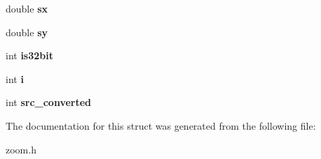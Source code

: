 \begin{DoxyCompactItemize}
\item 
double {\bfseries sx}\hypertarget{structzoom_a280d6095f6a032474b4b10ca0a9fa08a}{}\label{structzoom_a280d6095f6a032474b4b10ca0a9fa08a}

\item 
double {\bfseries sy}\hypertarget{structzoom_af138143150698333ed5d372af4d85704}{}\label{structzoom_af138143150698333ed5d372af4d85704}

\item 
int {\bfseries is32bit}\hypertarget{structzoom_aaa8e07a34f86b9cdbbea024dca4e6f5e}{}\label{structzoom_aaa8e07a34f86b9cdbbea024dca4e6f5e}

\item 
int {\bfseries i}\hypertarget{structzoom_adef455b427a7eeb7a80bb4cae65d5d2f}{}\label{structzoom_adef455b427a7eeb7a80bb4cae65d5d2f}

\item 
int {\bfseries src\+\_\+converted}\hypertarget{structzoom_af52c03d12f253c35c22b86f66450d972}{}\label{structzoom_af52c03d12f253c35c22b86f66450d972}

\end{DoxyCompactItemize}


The documentation for this struct was generated from the following file\+:\begin{DoxyCompactItemize}
\item 
zoom.\+h\end{DoxyCompactItemize}

